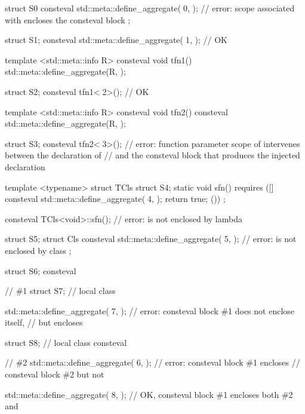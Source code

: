 \pnum
\begin{example}
\begin{codeblock}
struct S0 {
  consteval {
    std::meta::define_aggregate(^^S0, {});  // error: scope associated with  encloses the consteval block
  }
};

struct S1;
consteval { std::meta::define_aggregate(^^S1, {}); }    // OK

template <std::meta::info R> consteval void tfn1() {
  std::meta::define_aggregate(R, {});
}

struct S2;
consteval { tfn1<^^S2>(); }                             // OK

template <std::meta::info R> consteval void tfn2() {
  consteval { std::meta::define_aggregate(R, {}); }
}

struct S3;
consteval { tfn2<^^S3>(); }
  // error: function parameter scope of  intervenes between the declaration of 
  // and the consteval block that produces the injected declaration

template <typename> struct TCls {
  struct S4;
  static void sfn() requires ([] {
    consteval { std::meta::define_aggregate(^^S4, {}); }
    return true;
  }()) { }
};

consteval { TCls<void>::sfn(); }    // error:  is not enclosed by  lambda

struct S5;
struct Cls {
  consteval { std::meta::define_aggregate(^^S5, {}); }  // error:  is not enclosed by class 
};

struct S6;
consteval {                                 // \#1
  struct S7;                                // local class

  std::meta::define_aggregate(^^S7, {});    // error: consteval block \#1 does not enclose itself,
                                            // but encloses 

  struct S8;                                // local class
  consteval {                               // \#2
    std::meta::define_aggregate(^^S6, {});  // error: consteval block \#1 encloses
                                            // consteval block \#2 but not 

    std::meta::define_aggregate(^^S8, {});  // OK, consteval block \#1 encloses both \#2 and 
  }
}
\end{codeblock}
\end{example}

